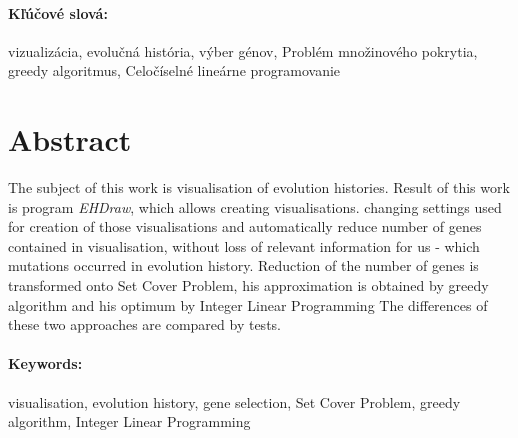 \documentclass[12pt,oneside]{book}
\begin{document}
\paragraph*{Kľúčové slová:} vizualizácia, evolučná história, výber génov, Problém množinového pokrytia,
greedy algoritmus, Celočíselné lineárne programovanie


\newpage 
\section*{Abstract}
The subject of this work is visualisation of evolution histories.
Result of this work is program \emph{EHDraw}, which allows creating visualisations.
changing settings used for creation of those visualisations and automatically reduce number of genes contained in visualisation,
without loss of relevant information for us - which mutations occurred in evolution history.
Reduction of the number of genes is transformed onto Set Cover Problem, his approximation is obtained by greedy algorithm and his optimum by Integer Linear Programming
The differences of these two approaches are compared by tests.


\paragraph*{Keywords:}  visualisation, evolution history, gene selection, Set Cover Problem,
greedy algorithm, Integer Linear Programming


%
%



\newpage 

\tableofcontents


\end{document}
